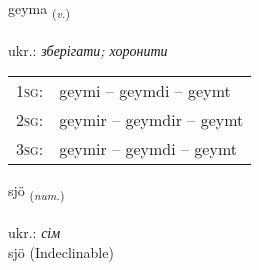 \documentclass[frontgrid, backgrid]{flacards}\usepackage[]{graphicx}\usepackage[]{xcolor}
\begin{document}
\renewcommand{\flhead}{\vskip5pt \fboxsep=0pt {\small\bfseries\footnotesize Sagnorð | дієслово}}
\renewcommand{\fcfoot}{\vskip5pt \fboxsep=0pt \hspace{2pt}{\small\bfseries\footnotesize 1K}}

\renewcommand{\blhead}{\vskip5pt {\small\bfseries\footnotesize Sagnorð | дієслово }}
\renewcommand{\bcfoot}{\vskip5pt \hspace{2pt}{\small\bfseries\footnotesize 1K}}


{geyma \small{\textsubscript{(\textit{v.})}} \\[1ex] %
\textphonetic{[ceiːma]} \\
ukr.: \emph{зберігати; хоронити} \\  [2ex]
\renewcommand*{\arraystretch}{0.8}
\begin{tabular}{p{1cm}l}
\textsc{1sg}: & geymi -- geymdi -- geymt \\ 
\textsc{2sg}: & geymir -- geymdir -- geymt \\ 
\textsc{3sg}: & geymir -- geymdi -- geymt \\ 
\end{tabular}
}


\renewcommand{\flhead}{\vskip5pt \fboxsep=0pt {\small\bfseries\footnotesize Töluorð | чисельник}}
\renewcommand{\fcfoot}{\vskip5pt \fboxsep=0pt \hspace{2pt}{\small\bfseries\footnotesize 1K}}

\renewcommand{\blhead}{\vskip5pt {\small\bfseries\footnotesize Töluorð | чисельник }}
\renewcommand{\bcfoot}{\vskip5pt \hspace{2pt}{\small\bfseries\footnotesize 1K}}


{sjö \small{\textsubscript{(\textit{num.})}} \\[1ex]
\textphonetic{[sjœː]} \\
ukr.: \emph{сім} \\  [2ex]
sjö (Indeclinable)}
\end{document}
